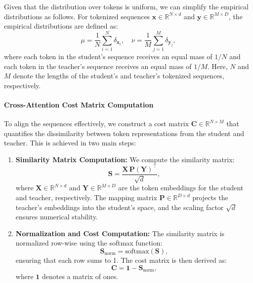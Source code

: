 Given that the distribution over tokens is uniform, we can simplify the empirical distributions as follows. For tokenized sequences \(\mathbf{x} \in \mathbb{R}^{N \times d}\) and \(\mathbf{y} \in \mathbb{R}^{M \times D}\), the empirical distributions are defined as:
\[
\mu = \frac{1}{N} \sum_{i=1}^{N} \delta_{\mathbf{x}_i}, \quad \nu = \frac{1}{M} \sum_{j=1}^{M} \delta_{\mathbf{y}_j},
\]
where each token in the student's sequence receives an equal mass of \(1/N\) and each token in the teacher's sequence receives an equal mass of \(1/M\). Here, \(N\) and \(M\) denote the lengths of the student’s and teacher’s tokenized sequences, respectively.

\paragraph{Cross-Attention Cost Matrix Computation} 
To align the sequences effectively, we construct a cost matrix \(\mathbf{C} \in \mathbb{R}^{N \times M}\) that quantifies the dissimilarity between token representations from the student and teacher. This is achieved in two main steps:
\begin{enumerate}
    \item \textbf{Similarity Matrix Computation:}  
    We compute the similarity matrix:
    \begin{equation}
        \mathbf{S} = \frac{\mathbf{X} \, \mathbf{P}(\mathbf{Y})^\top}{\sqrt{d}},
    \end{equation}
    where \(\mathbf{X} \in \mathbb{R}^{N \times d}\) and \(\mathbf{Y} \in \mathbb{R}^{M \times D}\) are the token embeddings for the student and teacher, respectively. The mapping matrix \(\mathbf{P} \in \mathbb{R}^{D \times d}\) projects the teacher’s embeddings into the student’s space, and the scaling factor \(\sqrt{d}\) ensures numerical stability.
    
    \item \textbf{Normalization and Cost Computation:}  
    The similarity matrix is normalized row-wise using the softmax function:
    \begin{equation}
        \mathbf{S}_{\text{norm}} = \mathrm{softmax}(\mathbf{S}),
    \end{equation}
    ensuring that each row sums to 1. The cost matrix is then derived as:
    \begin{equation}
        \mathbf{C} = \mathbf{1} - \mathbf{S}_{\text{norm}},
    \end{equation}
    where \(\mathbf{1}\) denotes a matrix of ones.
\end{enumerate}

